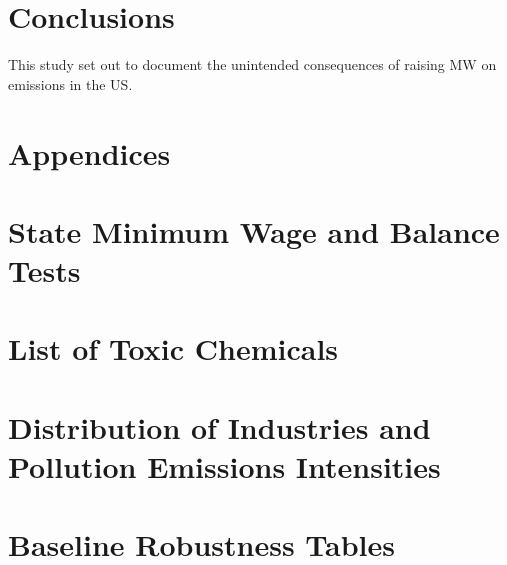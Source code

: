 \documentclass[12pt, english]{article}
\begin{document}
    
    
    
    


    \section{Conclusions}\label{sec:conclusions}
    This study set out to document the unintended consequences of raising MW on emissions in the US.

    \newpage
    \section*{Appendices}\label{sec:appendices}
    \begin{appendices}
        \renewcommand\thesection{\Roman{section}} %


        \section{State Minimum Wage and Balance Tests}\label{sec:state-minimum-wage-and-balance-tests}
        
        
        
        
        


        \section{List of Toxic Chemicals}\label{sec:list-of-toxic-chemicals}
        


        \section{Distribution of Industries and Pollution Emissions Intensities}\label{sec:distribution-of-industries-and-pollution-emissions-intensities}
        
        
        
        
        
        
        
        
        
        
        
        
        


        \section{Baseline Robustness Tables}\label{sec:baseline-robustness-tables}
        

    \end{appendices}
\end{document}
